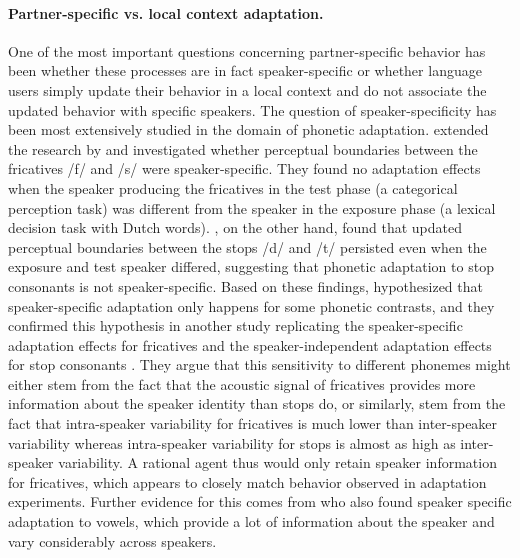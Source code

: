 \paragraph{Partner-specific vs. local context adaptation.} One of the most important questions concerning partner-specific behavior has been whether these processes are in fact
speaker-specific or whether language users simply update their behavior in a local context and do not associate the updated behavior with specific speakers.
The question of speaker-specificity has been most extensively studied in the domain of phonetic adaptation. \textcite{Eisner2005} extended the research by \textcite{Norris2003} and
investigated whether perceptual boundaries between the fricatives /f/ and /s/ were speaker-specific. They found no adaptation effects when the speaker producing the fricatives in the 
test phase (a categorical perception task) was different from the speaker in the exposure phase (a lexical decision task with Dutch words). \textcite{Kraljic2006}, 
on the other hand, found that updated perceptual boundaries between the stops /d/ and /t/ persisted even when the exposure and test speaker differed, suggesting that phonetic adaptation to stop consonants
is not speaker-specific.  Based on these findings, \citeauthor{Kraljic2006} hypothesized that speaker-specific adaptation only happens for some phonetic contrasts, and they confirmed this hypothesis
in another study replicating the speaker-specific adaptation effects for fricatives and the speaker-independent adaptation effects for stop consonants \cite{Kraljic2007}. They argue that 
this sensitivity to different phonemes might either stem from the fact that the acoustic signal of fricatives provides more information about the speaker identity than stops do, or similarly,
stem from the fact that intra-speaker variability for fricatives is much lower than inter-speaker variability whereas intra-speaker variability for stops is almost as high as inter-speaker variability.
A rational agent thus would only retain speaker information for fricatives, which appears to closely match behavior observed in adaptation experiments. Further evidence for this comes from \textcite{Trude2012}
who also found speaker specific adaptation to vowels, which provide a lot of information about the speaker and vary considerably across speakers.


